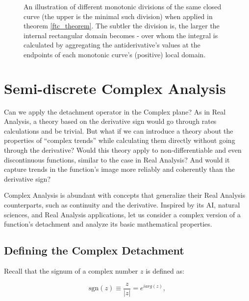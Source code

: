 \documentclass[11pt]{book}
\begin{document}
\begin{figure}[htp]




\caption{An illustration of different monotonic divisions of the same closed curve (the upper is the minimal such division) when applied in theorem \ref{ftc_theorem}.  The subtler the division is, the larger the internal rectangular domain becomes - over whom the integral is calculated by aggregating the antiderivative’s values at the endpoints of each monotonic curve’s (positive) local domain.}

\end{figure}

\chapter{Semi-discrete Complex Analysis}

Can we apply the detachment operator in the Complex plane? As in Real Analysis, a theory based on the derivative sign would go through rates calculations and be trivial. But what if we can introduce a theory about the properties of “complex trends” while calculating them directly without going through the derivative? Would this theory apply to non-differentiable and even discontinuous functions, similar to the case in Real Analysis? And would it capture trends in the function's image more reliably and coherently than the derivative sign?

Complex Analysis is abundant with concepts that generalize their Real Analysis counterparts, such as continuity and the derivative. Inspired by its AI, natural sciences, and Real Analysis applications, let us consider a complex version of a function's detachment and analyze its basic mathematical properties.

\section{Defining the Complex Detachment}
Recall that the signum of a complex number $z$ is defined as:

$$\text{sgn}\left(z\right)\equiv\frac{z}{\left|z\right|}=e^{iarg\left(z\right)},$$
\end{document}
